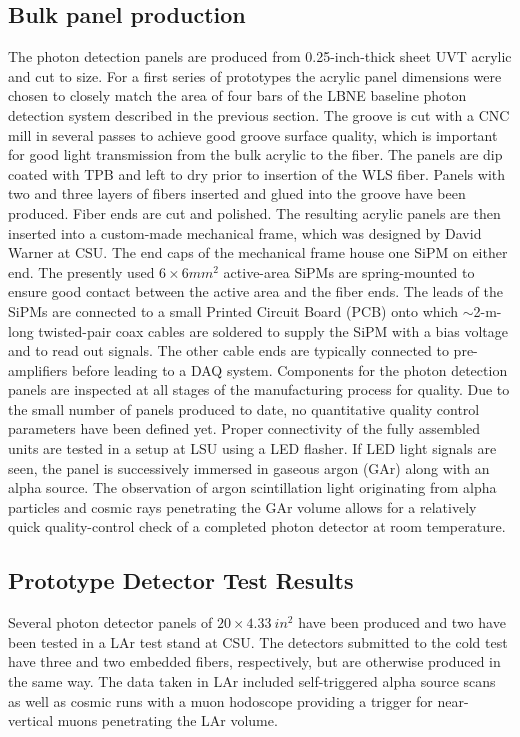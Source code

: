 \subsection{Bulk panel production}

The photon detection panels are produced from 0.25-inch-thick sheet
UVT acrylic and cut to size. For a first series of prototypes the
acrylic panel dimensions were chosen to closely match the area of four
bars of the LBNE baseline photon detection system described in the
previous section.  The groove is cut with a CNC mill in several passes
to achieve good groove surface quality, which is important for good
light transmission from the bulk acrylic to the fiber. The panels are
dip coated with TPB and left to dry prior to insertion of the WLS
fiber. Panels with two and three layers of fibers inserted and glued
into the groove have been produced. Fiber ends are cut and polished.
The resulting acrylic panels are then inserted into a custom-made
mechanical frame, which was designed by David Warner at CSU.  The end
caps of the mechanical frame house one SiPM on either end. The
presently used $6\times6 mm^2$ active-area SiPMs are spring-mounted to
ensure good contact between the active area and the fiber ends.  The
leads of the SiPMs are connected to a small Printed Circuit Board
(PCB) onto which $\sim$2-m-long twisted-pair coax cables are soldered
to supply the SiPM with a bias voltage and to read out signals. The
other cable ends are typically connected to pre-amplifiers before
leading to a DAQ system.  Components for the photon detection panels
are inspected at all stages of the manufacturing process for
quality. Due to the small number of panels produced to date, no
quantitative quality control parameters have been defined yet.  Proper
connectivity of the fully assembled units are tested in a setup at LSU
using a LED flasher. If LED light signals are seen, the panel is
successively immersed in gaseous argon (GAr) along with an alpha
source. The observation of argon scintillation light originating from
alpha particles and cosmic rays penetrating the GAr volume allows for
a relatively quick quality-control check of a completed photon
detector at room temperature.

\subsection{Prototype Detector Test Results}

Several photon detector panels of $20 \times 4.33~in^2$ have been
produced and two have been tested in a LAr test stand at CSU. The
detectors submitted to the cold test have three and two embedded fibers,
respectively, but are otherwise produced in the same way. The data
taken in LAr included self-triggered alpha source scans as well as
cosmic runs with a muon hodoscope providing a trigger for near-vertical muons penetrating the LAr volume.
